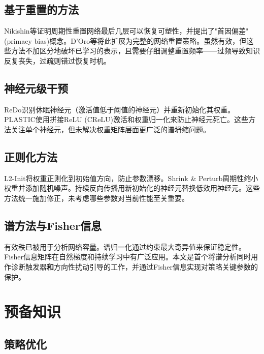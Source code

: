 \documentclass[twocolumn]{article}
\begin{document}
\subsection{基于重置的方法}

Nikishin等\cite{nikishin2022primacy}证明周期性重置网络最后几层可以恢复可塑性，并提出了"首因偏差"(primacy bias)概念。D'Oro等\cite{doro2023sampleefficient}将此扩展为完整的网络重置策略。虽然有效，但这些方法不加区分地破坏已学习的表示，且需要仔细调整重置频率——过频导致知识反复丧失，过疏则错过恢复时机。

\subsection{神经元级干预}

ReDo\cite{sokar2023dormant}识别休眠神经元（激活值低于阈值的神经元）并重新初始化其权重。PLASTIC\cite{lyle2024disentangling}使用拼接ReLU (CReLU)激活和权重归一化来防止神经元死亡。这些方法关注单个神经元，但未解决权重矩阵层面更广泛的谱坍缩问题。

\subsection{正则化方法}

L2-Init\cite{kumar2023maintaining}将权重正则化到初始值方向，防止参数漂移。Shrink \& Perturb\cite{ash2020warm}周期性缩小权重并添加随机噪声。持续反向传播\cite{dohare2024loss}用新初始化的神经元替换低效用神经元。这些方法统一施加修正，未考虑哪些参数对当前性能至关重要。

\subsection{谱方法与Fisher信息}

有效秩\cite{roy2007effective}已被用于分析网络容量\cite{yang2023spectral}。谱归一化\cite{miyato2018spectral}通过约束最大奇异值来保证稳定性。Fisher信息矩阵在自然梯度\cite{kakade2001natural,schulman2015trust}和持续学习\cite{kirkpatrick2017overcoming}中有广泛应用。本文是首个将谱分析同时用作诊断触发器\textbf{和}方向性扰动引导的工作，并通过Fisher信息实现对策略关键参数的保护。


\section{预备知识}
\label{sec:prelim}

\subsection{策略优化}
\end{document}
